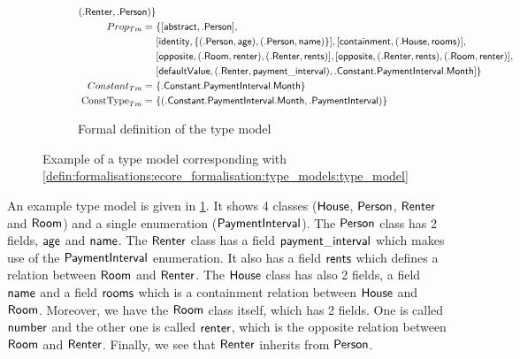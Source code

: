 \begin{figure}[p]
\begin{subfigure}{\textwidth}
\begin{align*}
                ( .\mathsf{Renter}, .\mathsf{Person} )
            \}\\
            Prop_{Tm} =\ & \{ 
                [ \mathsf{abstract}, .\mathsf{Person} ], \\&
                [ \mathsf{identity}, \{( .\mathsf{Person}, \mathsf{age} ), ( .\mathsf{Person}, \mathsf{name} )\} ],
                [ \mathsf{containment}, ( .\mathsf{House}, \mathsf{rooms} ) ],\\&
                [ \mathsf{opposite}, ( .\mathsf{Room}, \mathsf{renter} ), ( .\mathsf{Renter}, \mathsf{rents} ) ], 
                [ \mathsf{opposite}, ( .\mathsf{Renter}, \mathsf{rents} ), ( .\mathsf{Room}, \mathsf{renter} ) ],\\&
                [ \mathsf{defaultValue}, ( .\mathsf{Renter}, \mathsf{payment\_interval} ), .\mathsf{Constant}.\mathsf{PaymentInterval}.\mathsf{Month} ]
            \}\\
            Constant_{Tm} =\ & \{ 
                .\mathsf{Constant}.\mathsf{PaymentInterval}.\mathsf{Month}
            \}\\
            \mathrm{ConstType}_{Tm} =\ & \{ 
                ( .\mathsf{Constant}.\mathsf{PaymentInterval}.\mathsf{Month}, .\mathsf{PaymentInterval} )
            \}
        \end{align*}
        \caption{Formal definition of the type model}
    \end{subfigure}
    \caption{Example of a type model corresponding with \cref{defin:formalisations:ecore_formalisation:type_models:type_model}}
    \label{fig:formalisations:ecore_formalisation:type_models:type_model_example}
\end{figure}

An example type model is given in \cref{fig:formalisations:ecore_formalisation:type_models:type_model_example}. It shows 4 classes ($\mathsf{House}$, $\mathsf{Person}$, $\mathsf{Renter}$ and $\mathsf{Room}$) and a single enumeration ($\mathsf{PaymentInterval}$). The $\mathsf{Person}$ class has 2 fields, $\mathsf{age}$ and $\mathsf{name}$. The $\mathsf{Renter}$ class has a field $\mathsf{payment\_interval}$ which makes use of the $\mathsf{PaymentInterval}$ enumeration. It also has a field $\mathsf{rents}$ which defines a relation between $\mathsf{Room}$ and $\mathsf{Renter}$. The $\mathsf{House}$ class has also 2 fields, a field $\mathsf{name}$ and a field $\mathsf{rooms}$ which is a containment relation between $\mathsf{House}$ and $\mathsf{Room}$. Moreover, we have the $\mathsf{Room}$ class itself, which has 2 fields. One is called $\mathsf{number}$ and the other one is called $\mathsf{renter}$, which is the opposite relation between $\mathsf{Room}$ and $\mathsf{Renter}$. Finally, we see that $\mathsf{Renter}$ inherits from $\mathsf{Person}$.

